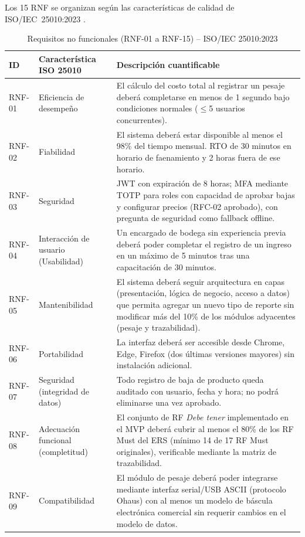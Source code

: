 \documentclass[11pt,a4paper]{article}
\begin{document}
Los 15 RNF se organizan según las características de calidad de ISO/IEC~25010:2023 \cite{iso25010}.

\begin{longtable}{|p{1.4cm}|p{3cm}|p{9.5cm}|}
\caption{Requisitos no funcionales (RNF-01 a RNF-15) -- ISO/IEC 25010:2023}\\
\hline
\textbf{ID} & \textbf{Característica ISO 25010} & \textbf{Descripción cuantificable} \\
\hline
RNF-01 & Eficiencia de desempeño & El cálculo del costo total al registrar un pesaje deberá completarse en menos de 1 segundo bajo condiciones normales ($\leq$5 usuarios concurrentes). \\
\hline
RNF-02 & Fiabilidad & El sistema deberá estar disponible al menos el 98\% del tiempo mensual. RTO de 30 minutos en horario de faenamiento y 2 horas fuera de ese horario. \\
\hline
RNF-03 & Seguridad & JWT con expiración de 8 horas; MFA mediante TOTP para roles con capacidad de aprobar bajas y configurar precios (RFC-02 aprobado), con pregunta de seguridad como fallback offline. \\
\hline
RNF-04 & Interacción de usuario (Usabilidad) & Un encargado de bodega sin experiencia previa deberá poder completar el registro de un ingreso en un máximo de 5 minutos tras una capacitación de 30 minutos. \\
\hline
RNF-05 & Mantenibilidad & El sistema deberá seguir arquitectura en capas (presentación, lógica de negocio, acceso a datos) que permita agregar un nuevo tipo de reporte sin modificar más del 10\% de los módulos adyacentes (pesaje y trazabilidad). \\
\hline
RNF-06 & Portabilidad & La interfaz deberá ser accesible desde Chrome, Edge, Firefox (dos últimas versiones mayores) sin instalación adicional. \\
\hline
RNF-07 & Seguridad (integridad de datos) & Todo registro de baja de producto queda auditado con usuario, fecha y hora; no podrá eliminarse una vez aprobado. \\
\hline
RNF-08 & Adecuación funcional (completitud) & El conjunto de RF \textit{Debe tener} implementado en el MVP deberá cubrir al menos el 80\% de los RF Must del ERS (mínimo 14 de 17 RF Must originales), verificable mediante la matriz de trazabilidad. \\
\hline
RNF-09 & Compatibilidad & El módulo de pesaje deberá poder integrarse mediante interfaz serial/USB ASCII (protocolo Ohaus) con al menos un modelo de báscula electrónica comercial sin requerir cambios en el modelo de datos. \\

\end{longtable}
\end{document}
